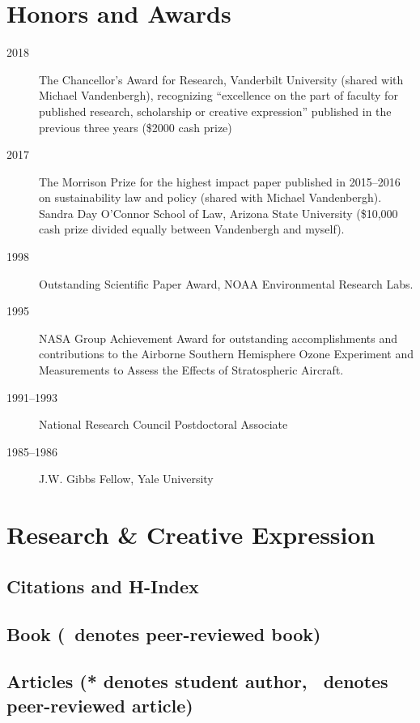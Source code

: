 \documentclass[10pt]{article}
\begin{document}
\section{Honors and Awards}
\begin{description}
\item[2018] The Chancellor's Award for Research, Vanderbilt University (shared with Michael Vandenbergh), recognizing ``excellence on the part of faculty for published research, scholarship or creative expression'' published in the previous three years (\$2000 cash prize)
\item[2017] The Morrison Prize for the highest impact paper published in 2015--2016 on sustainability law and policy (shared with Michael Vandenbergh). Sandra Day O'Connor School of Law, Arizona State University (\$10,000 cash prize divided equally between Vandenbergh and myself).
\item[1998] Outstanding Scientific Paper Award, NOAA Environmental Research Labs.
\item[1995] NASA Group Achievement Award for outstanding accomplishments and contributions to the Airborne Southern Hemisphere Ozone Experiment and Measurements to Assess the Effects of Stratospheric Aircraft.
\item[1991--1993] National Research Council Postdoctoral Associate
\item[1985--1986] J.W. Gibbs Fellow, Yale University
\end{description}

\clearpage
\section{Research \& Creative Expression}
    \subsection{Citations and H-Index}
    
    \nocite{*}%
    \subsection[Book]{Book (\textdagger\ denotes peer-reviewed book)}
        \begin{refsection}
            \nocite{*}
            \printbibliography[heading=none,type=book]
        \end{refsection}
    \subsection[Articles]{Articles (* denotes student author, \textdagger\ denotes peer-reviewed article)}
    \begin{refsection}
        \nocite{*}
        \printbibliography[heading=none,type=article]
    \end{refsection}
\end{document}
